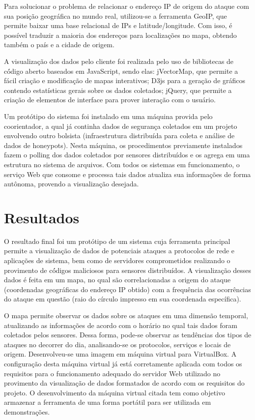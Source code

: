 Para solucionar o problema de relacionar o endereço IP de origem do ataque com sua posição geográfica no mundo real, utilizou-se a ferramenta GeoIP\cite{geoip}, que permite baixar uma base relacional de IPs e latitude/longitude. Com isso, é possível traduzir a maioria dos endereços para localizações no mapa, obtendo também o país e a cidade de origem.

A visualização dos dados pelo cliente foi realizada pelo uso de bibliotecas de có́digo aberto baseados em JavaScript, sendo elas: jVectorMap\cite{jvectormap}, que permite a fácil criação e modificação de mapas interativos; D3js para a geração de gráficos contendo estatísticas gerais sobre os dados coletados; jQuery\cite{jquery}, que permite a criação de elementos de interface para prover interação com o usuário.

Um protótipo do sistema foi instalado em uma máquina provida pelo coorientador, a qual já continha dados de segurança coletados em um projeto envolvendo outro bolsista (infraestrutura distribuída para coleta e análise de dados de honeypots). Nesta máquina, os procedimentos previamente instalados fazem o polling dos dados coletados por sensores distribuídos e os agrega em uma estrutura no sistema de arquivos. Com todos os sistemas em funcionamento, o serviço Web que consome e processa tais dados atualiza sua informações de forma autônoma, provendo a visualização desejada.

\chapter{Resultados}
O resultado final foi um protótipo de um sistema cuja ferramenta principal permite a visualização de dados de potenciais ataques a protocolos de rede e aplicações de sistema, bem como de servidores comprometidos realizando o provimento de có́digos maliciosos para sensores distribuídos. A visualização desses dados é feita em um mapa, no qual são correlacionadas a origem do ataque (coordenadas geográficas do endereço IP obtido) com a frequência das ocorrências do ataque em questão (raio do círculo impresso em sua coordenada específica).

O mapa permite observar os dados sobre os ataques em uma dimensão temporal, atualizando as informações de acordo com o horário no qual tais dados foram coletados pelos sensores. Dessa forma, pode-se observar as tendências dos tipos de ataques no decorrer do dia, analisando-se os protocolos, serviços e locais de origem.
Desenvolveu-se uma imagem em máquina virtual para VirtualBox. A configuração desta máquina virtual já está corretamente aplicada com todos os requisitos para o funcionamento adequado do servidor Web utilizado no provimento da visualização de dados formatados de acordo com os requisitos do projeto. O desenvolvimento da máquina virtual citada tem como objetivo armazenar a ferramenta de uma forma portátil para ser utilizada em demonstrações. 

